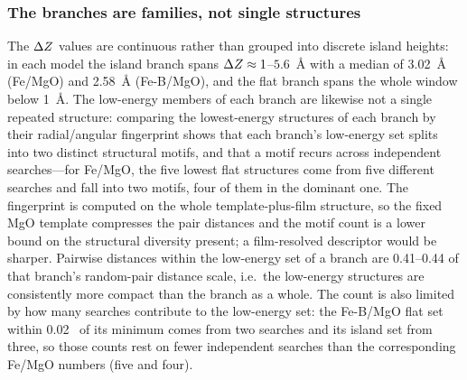 \subsubsection{The branches are families, not single structures} The $\Delta Z$ values are continuous rather
than grouped into discrete island heights: in each model the island branch spans $\Delta Z \approx
1$--$5.6$~\AA{} with a median of 3.02~\AA{} (Fe/MgO) and 2.58~\AA{} (Fe-B/MgO), and the flat branch
spans the whole window below 1~\AA. The low-energy members of each branch are likewise not a single
repeated structure: comparing the lowest-energy structures of each branch by their radial/angular
fingerprint shows that each branch's low-energy set splits into two distinct structural
motifs, and that a motif recurs across independent searches---for Fe/MgO, the five lowest flat
structures come from five different searches and fall into two motifs, four of them in the dominant
one.
The fingerprint is computed on the whole template-plus-film structure, so the fixed MgO template
compresses the pair distances and the motif count is a lower bound on the structural
diversity present; a film-resolved descriptor would be sharper. Pairwise distances within the
low-energy set of a branch are 0.41--0.44 of that branch's random-pair distance scale, i.e.\ the
low-energy structures are consistently more compact than the branch as a whole. The count is also
limited by how many searches contribute to the low-energy set: the Fe-B/MgO flat set within
0.02~\eVA{} of its minimum comes from two searches and its island set from three, so those counts
rest on fewer independent searches than the corresponding Fe/MgO numbers (five and four).

